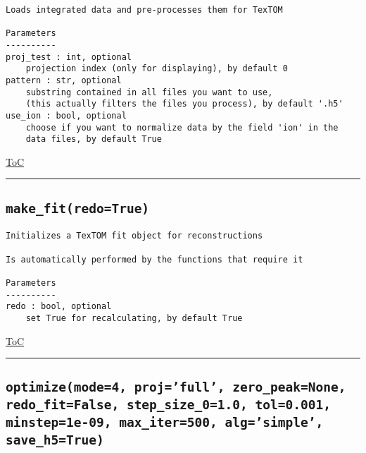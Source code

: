 \documentclass{article}
\begin{document}
\begin{lstlisting}[language=docstring]
Loads integrated data and pre-processes them for TexTOM

Parameters
----------
proj_test : int, optional
    projection index (only for displaying), by default 0
pattern : str, optional
    substring contained in all files you want to use, 
    (this actually filters the files you process), by default '.h5'
use_ion : bool, optional
    choose if you want to normalize data by the field 'ion' in the 
    data files, by default True
\end{lstlisting}

\begin{flushright}

\hyperref[toc]{ToC}

\end{flushright}



\vspace{5mm}

\hrule

\subsection*{\texttt{make\_fit(redo=True)}}
\label{fun:makefit}

\begin{lstlisting}[language=docstring]
Initializes a TexTOM fit object for reconstructions

Is automatically performed by the functions that require it

Parameters
----------
redo : bool, optional
    set True for recalculating, by default True
\end{lstlisting}

\begin{flushright}

\hyperref[toc]{ToC}

\end{flushright}



\vspace{5mm}

\hrule

\subsection*{\texttt{optimize(mode=4, proj='full', zero\_peak=None, redo\_fit=False, step\_size\_0=1.0, tol=0.001, minstep=1e-09, max\_iter=500, alg='simple', save\_h5=True)}}
\label{fun:optimize}
\end{document}
